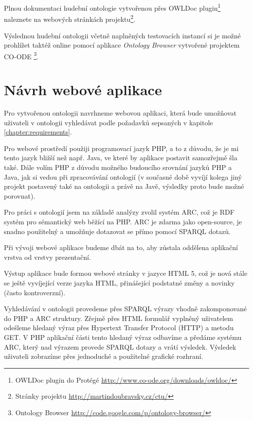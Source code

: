 Plnou dokumentaci hudební ontologie vytvořenou přes OWLDoc plugin\footnote{OWLDoc plugin do Protégé \url{http://www.co-ode.org/downloads/owldoc/}} naleznete na webových stránkách projektu\footnote{Stránky projektu \url{http://martindoubravsky.cz/ctu/}}.

Výslednou hudební ontologii včetně naplněných testovacích instancí si je možné prohlížet taktéž online pomocí aplikace \textit{Ontology Browser} vytvořené projektem CO-ODE \footnote{Ontology Browser \url{http://code.google.com/p/ontology-browser/}}.

\section{Návrh webové aplikace}
\label{chapter:webappdesign}

Pro vytvořenou ontologii navrhneme webovou aplikaci, která bude umožňovat uživateli v ontologii vyhledávat podle požadavků sepsaných v kapitole \ref{chapter:requirements}.

Pro webové prostředí použiji programovací jazyk PHP, a to z důvodu, že je mi tento jazyk bližší než např. Java, ve které by aplikace postavit samozřejmě šla také.
Dále volím PHP z důvodu možného budoucího srovnání jazyků PHP a Java, jak si vedou při zpracovávání ontologií (v současné době vyvíjí kolega jiný projekt postavený také na ontologii a právě na Javě, výsledky proto bude možné porovnat).

Pro práci s ontologií jsem na základě analýzy zvolil systém ARC, což je RDF systém pro sémantický web běžící na PHP.
ARC je zdarma jako open-source, je snadno použitelný a umožňuje dotazovat se přímo pomocí SPARQL dotazů.

Při vývoji webové aplikace budeme dbát na to, aby zůstala oddělena aplikační vrstva od vrstvy prezentační. 

Výstup aplikace bude formou webové stránky v jazyce HTML 5, což je nová stále se ještě vyvíjející verze jazyka HTML, přinášející podstatné změny a novinky (často kontroverzní). 

Vyhledávání v ontologii provedeme přes SPARQL výrazy vhodně zakomponované do PHP a ARC struktury.
Zřejmě přes HTML formulář vyplněný uživatelem odešleme hledaný výraz přes Hypertext Transfer Protocol (HTTP) a metodu GET. V PHP aplikační části tento hledaný výraz odbavíme a předáme systému ARC, který nad výrazem provede SPARQL dotazy a vrátí výsledek.
Výsledek uživateli zobrazíme přes jednoduché a použitelné grafické rozhraní.